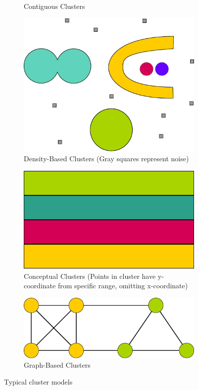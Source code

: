 \begin{figure}[h]
\begin{subfigure}{.49\textwidth}
  \caption{Contiguous Clusters}
  \label{fig:contiguousClusters}
\end{subfigure}
\begin{subfigure}{.49\textwidth}
  \centering
  \includegraphics[width=.5\linewidth]{img/densityClusters.eps}
  \caption{Density-Based Clusters (Gray squares represent noise)}
  \label{fig:densityClusters}
\end{subfigure}
\vspace*{0.5cm} 
\begin{subfigure}{.49\textwidth}
  \centering
  \includegraphics[width=.5\linewidth]{img/conceptualClusters.eps}
  \caption{Conceptual Clusters (Points in cluster have y-coordinate from specific range, omitting x-coordinate)}
  \label{fig:conceptualClusters}
\end{subfigure}
\begin{subfigure}{.49\textwidth}
  \centering
  \includegraphics[width=.5\linewidth]{img/graphClusters.eps}
  \caption{Graph-Based Clusters}
  \label{fig:graphClusters}
\end{subfigure}
\caption{Typical cluster models}
\end{figure}

